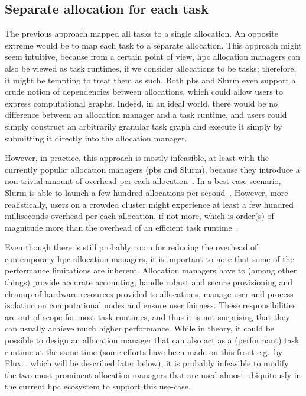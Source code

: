\subsection*{Separate allocation for each task}
The previous approach mapped all tasks to a single allocation. An opposite extreme would be to map
each task to a separate allocation. This approach might seem intuitive, because from a certain
point of view, \gls{hpc} allocation managers can also be viewed as task runtimes, if
we consider allocations to be tasks; therefore, it might be tempting to treat them as such. Both
\gls{pbs} and Slurm even support a crude notion of dependencies between allocations,
which could allow users to express computational graphs. Indeed, in an ideal world, there would be
no difference between an allocation manager and a task runtime, and users could simply construct an
arbitrarily granular task graph and execute it simply by submitting it directly into the allocation
manager.

However, in practice, this approach is mostly infeasible, at least with the currently popular
allocation managers (\gls{pbs} and Slurm), because they introduce a non-trivial
amount of overhead per each allocation~\cite{falkon}. In a best case scenario, Slurm is
able to launch a few hundred allocations per second~\cite{slurm-throughput}. However, more
realistically, users on a crowded cluster might experience at least a few hundred milliseconds
overhead per each allocation, if not more, which is order(s) of magnitude more than the overhead of
an efficient task runtime~\cite{rsds}.

Even though there is still probably room for reducing the overhead of contemporary
\gls{hpc} allocation managers, it is important to note that some of the performance
limitations are inherent. Allocation managers have to (among other things) provide accurate
accounting, handle robust and secure provisioning and cleanup of hardware resources provided to
allocations, manage user and process isolation on computational nodes and ensure user fairness.
These responsibilities are out of scope for most task runtimes, and thus it is not surprising that
they can usually achieve much higher performance. While in theory, it could be possible to design
an allocation manager that can also act as a (performant) task runtime at the same time (some
efforts have been made on this front e.g.\ by Flux~\cite{flux}, which will be described
later below), it is probably infeasible to modify the two most prominent allocation managers that
are used almost ubiquitously in the current \gls{hpc} ecosystem to support this
use-case.


